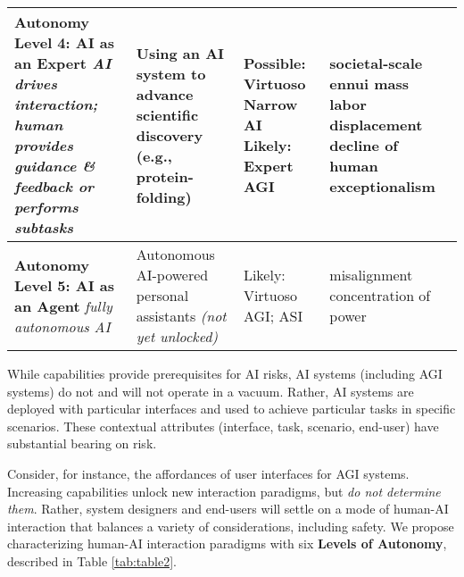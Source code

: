 \documentclass{article}
\theoremstyle{plain}
\theoremstyle{definition}
\theoremstyle{remark}
\begin{document}
\begin{table*}[h!]
\begin{center}
\begin{small}
\begin{tabular}{|p{}|p{}|p{}|p{}|}
    \textbf{Autonomy Level 4: \newline AI as an Expert} \newline \textit{AI drives interaction; human provides guidance \& feedback or performs subtasks} & Using an AI system to advance scientific discovery (e.g., protein-folding) & Possible: \newline Virtuoso Narrow AI  \newline\newline Likely: \newline Expert AGI & societal-scale ennui \newline\newline mass labor \newline displacement \newline\newline decline of human exceptionalism \\ \hline
    \textbf{Autonomy Level 5: \newline AI as an Agent} \newline \textit{fully autonomous AI} & Autonomous AI-powered \newline personal assistants \newline \textit{(not yet unlocked)} & Likely: \newline Virtuoso AGI; \newline ASI & misalignment \newline\newline concentration \newline of power \\ \hline
    \end{tabular}
\end{small}
\end{center}
\end{table*}

While capabilities provide prerequisites for AI risks, AI systems (including AGI systems) do not and will not operate in a vacuum. Rather, AI systems are deployed with particular interfaces and used to achieve particular tasks in specific scenarios. These contextual attributes (interface, task, scenario, end-user) have substantial bearing on risk. %

Consider, for instance, the affordances of user interfaces for AGI systems. Increasing capabilities unlock new interaction paradigms, but \textit{do not determine them}. Rather, system designers and end-users will settle on a mode of human-AI interaction \citep{morris2023design} that balances a variety of considerations, including safety. We propose characterizing human-AI interaction paradigms with six \textbf{Levels of Autonomy}, described in Table \ref{tab:table2}. 
\end{document}
